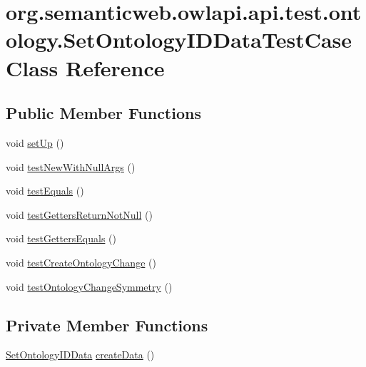\hypertarget{classorg_1_1semanticweb_1_1owlapi_1_1api_1_1test_1_1ontology_1_1_set_ontology_i_d_data_test_case}{\section{org.\-semanticweb.\-owlapi.\-api.\-test.\-ontology.\-Set\-Ontology\-I\-D\-Data\-Test\-Case Class Reference}
\label{classorg_1_1semanticweb_1_1owlapi_1_1api_1_1test_1_1ontology_1_1_set_ontology_i_d_data_test_case}
}
\subsection*{Public Member Functions}
\begin{DoxyCompactItemize}
\item 
void \hyperlink{classorg_1_1semanticweb_1_1owlapi_1_1api_1_1test_1_1ontology_1_1_set_ontology_i_d_data_test_case_a864c3d65eb47de281266351c330b0886}{set\-Up} ()
\item 
void \hyperlink{classorg_1_1semanticweb_1_1owlapi_1_1api_1_1test_1_1ontology_1_1_set_ontology_i_d_data_test_case_a5622a037974d68b89b72c92f358c6f3f}{test\-New\-With\-Null\-Args} ()
\item 
void \hyperlink{classorg_1_1semanticweb_1_1owlapi_1_1api_1_1test_1_1ontology_1_1_set_ontology_i_d_data_test_case_a8fbdeb90bcc39f383c48e6398d56b0bb}{test\-Equals} ()
\item 
void \hyperlink{classorg_1_1semanticweb_1_1owlapi_1_1api_1_1test_1_1ontology_1_1_set_ontology_i_d_data_test_case_a6548e2266ada3e308ed2549bf9f5f423}{test\-Getters\-Return\-Not\-Null} ()
\item 
void \hyperlink{classorg_1_1semanticweb_1_1owlapi_1_1api_1_1test_1_1ontology_1_1_set_ontology_i_d_data_test_case_a582d3e4b9bb860259235374a80596cb4}{test\-Getters\-Equals} ()
\item 
void \hyperlink{classorg_1_1semanticweb_1_1owlapi_1_1api_1_1test_1_1ontology_1_1_set_ontology_i_d_data_test_case_a128c8946623149d18d1ca520149d8ab1}{test\-Create\-Ontology\-Change} ()
\item 
void \hyperlink{classorg_1_1semanticweb_1_1owlapi_1_1api_1_1test_1_1ontology_1_1_set_ontology_i_d_data_test_case_abd9acd638b042c9b6cc65e85f342b9e7}{test\-Ontology\-Change\-Symmetry} ()
\end{DoxyCompactItemize}
\subsection*{Private Member Functions}
\begin{DoxyCompactItemize}
\item 
\hyperlink{classorg_1_1semanticweb_1_1owlapi_1_1change_1_1_set_ontology_i_d_data}{Set\-Ontology\-I\-D\-Data} \hyperlink{classorg_1_1semanticweb_1_1owlapi_1_1api_1_1test_1_1ontology_1_1_set_ontology_i_d_data_test_case_a23dc723053340159a64a47a635175b90}{create\-Data} ()
\end{DoxyCompactItemize}
